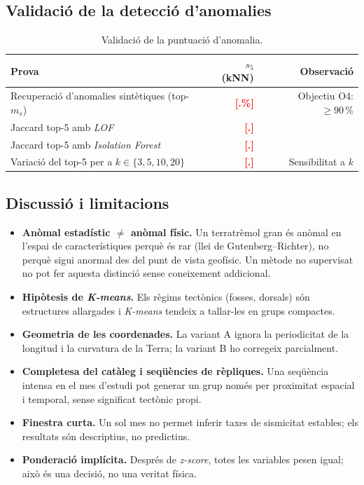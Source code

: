 \documentclass[11pt,a4paper]{article}
\newcommand{\pend}[1]{\textcolor{red}{\textbf{[#1]}}}
\begin{document}
\subsection{Validació de la detecció d'anomalies}
\begin{table}[htbp]
\centering
\small
\begin{tabular}{@{}lrr@{}}
\toprule
\textbf{Prova} & \textbf{$s_5$ (kNN)} & \textbf{Observació} \\
\midrule
Recuperació d'anomalies sintètiques (top-$m_s$) & \pend{.\%} &
  Objectiu O4: $\ge 90\,\%$ \\
Jaccard top-5 amb \textit{LOF} & \pend{.} & \\
Jaccard top-5 amb \textit{Isolation Forest} & \pend{.} & \\
Variació del top-5 per a $k\in\{3,5,10,20\}$ & \pend{.} & Sensibilitat a $k$ \\
\bottomrule
\end{tabular}
\caption{Validació de la puntuació d'anomalia.}\label{tab:validacio_anom}
\end{table}

\subsection{Discussió i limitacions}
\begin{itemize}[nosep]
  \item \textbf{Anòmal estadístic $\neq$ anòmal físic.} Un terratrèmol gran
        és anòmal en l'espai de característiques perquè és rar (llei de
        Gutenberg--Richter), no perquè sigui anormal des del punt de vista
        geofísic. Un mètode no supervisat no pot fer aquesta distinció sense
        coneixement addicional.
  \item \textbf{Hipòtesis de \textit{K-means}.} Els règims tectònics (fosses,
        dorsals) són estructures allargades i \textit{K-means} tendeix a
        tallar-les en grups compactes.
  \item \textbf{Geometria de les coordenades.} La variant A ignora la
        periodicitat de la longitud i la curvatura de la Terra; la variant B
        ho corregeix parcialment.
  \item \textbf{Completesa del catàleg i seqüències de rèpliques.} Una
        seqüència intensa en el mes d'estudi pot generar un grup només per
        proximitat espacial i temporal, sense significat tectònic propi.
  \item \textbf{Finestra curta.} Un sol mes no permet inferir taxes de
        sismicitat estables; els resultats són descriptius, no predictius.
  \item \textbf{Ponderació implícita.} Després de \textit{z-score}, totes les
        variables pesen igual; això és una decisió, no una veritat física.
\end{itemize}
\end{document}
